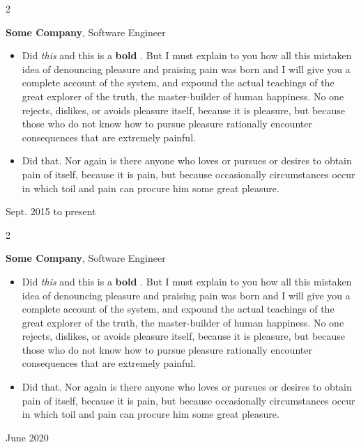 \documentclass[10pt, letterpaper]{article}
\newenvironment{highlights}{
    \begin{itemize}[
        topsep=0.10 cm,
        parsep=0.10 cm,
        partopsep=0pt,
        itemsep=0pt,
        leftmargin=0.4 cm + 10pt
    ]
}{
    \end{itemize}
} %
\newenvironment{twocolentry}[2][]{
    \onecolentry
    \def\secondColumn{#2}
    \setcolumnwidth{\fill, 4.5 cm}
    \begin{paracol}{2}
}{
    \switchcolumn \raggedleft \secondColumn
    \end{paracol}
    \endonecolentry
} %
\let\hrefWithoutArrow\href
\renewcommand{\href}[2]{\hrefWithoutArrow{#1}{\mbox{\ifthenelse{\equal{#2}{}}{ }{#2 }\raisebox{.15ex}{\footnotesize \faExternalLink*}}}}
\begin{document}
        \vspace{0.2 cm}

        \begin{twocolentry}{
            Sept. 2015 to present
        }
            \textbf{Some \textnormal{Company}}, Software Engineer
            \begin{highlights}
                \item Did \textit{this} and this is a \textbf{bold} \href{https://example.com}{link}. But I must explain to you how all this mistaken idea of denouncing pleasure and praising pain was born and I will give you a complete account of the system, and expound the actual teachings of the great explorer of the truth, the master-builder of human happiness. No one rejects, dislikes, or avoids pleasure itself, because it is pleasure, but because those who do not know how to pursue pleasure rationally encounter consequences that are extremely painful.
                \item Did that. Nor again is there anyone who loves or pursues or desires to obtain pain of itself, because it is pain, but because occasionally circumstances occur in which toil and pain can procure him some great pleasure.
            \end{highlights}
        \end{twocolentry}


        \vspace{0.2 cm}

        \begin{twocolentry}{
            June 2020
        }
            \textbf{Some \textnormal{Company}}, Software Engineer
            \begin{highlights}
                \item Did \textit{this} and this is a \textbf{bold} \href{https://example.com}{link}. But I must explain to you how all this mistaken idea of denouncing pleasure and praising pain was born and I will give you a complete account of the system, and expound the actual teachings of the great explorer of the truth, the master-builder of human happiness. No one rejects, dislikes, or avoids pleasure itself, because it is pleasure, but because those who do not know how to pursue pleasure rationally encounter consequences that are extremely painful.
                \item Did that. Nor again is there anyone who loves or pursues or desires to obtain pain of itself, because it is pain, but because occasionally circumstances occur in which toil and pain can procure him some great pleasure.
            \end{highlights}
        \end{twocolentry}
\end{document}
